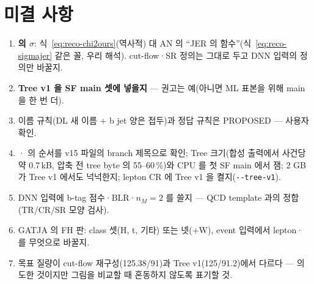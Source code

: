 \section{미결 사항}\label{sec:reco-open}
\begin{openq}
\begin{enumerate}
\item \textbf{\chisq{} 의 $\sigma$}: 식~\eqref{eq:reco-chi2ours}(역사적) 대 AN 의 ``JER 의 함수''(식~\eqref{eq:reco-sigmajer} 같은 꼴, 우리 해석).
      cut-flow·SR 정의는 그대로 두고 DNN 입력의 정의만 바꿀지.
\item \textbf{Tree v1 을 SF main 셋에 넣을지} — 권고는 예(아니면 ML 표본을 위해 main 을 한 번 더).
\item 이름 규칙(DL 새 이름 + b jet 양은  접두)과 정답 규칙은 PROPOSED — 사용자 확인.
\item {}· 의 순서를 v15 파일의 branch 제목으로 확인; Tree 크기(합성 출력에서 사건당 약 0.7\,kB, 압축 전 tree byte 의
      55–60\,\%)와 CPU 를 첫 SF main 에서 잼;  2 GB 가 Tree v1 에서도 넉넉한지; lepton CR 에 Tree v1 을 켤지(\texttt{-{}-tree-v1}).
\item DNN 입력에 b-tag 점수·BLR·$n_M=2$ \chisq{} 를 쓸지 — QCD template 과의 정합(TR/CR/SR 모양 검사).
\item GATJA 의 FH 판: class 셋(H, t, 기타) 또는 넷(+W), event 입력에서 lepton·\MET{} 를 무엇으로 바꿀지.
\item 목표 질량이 cut-flow 재구성(125.38/91)과 Tree v1(125/91.2)에서 다르다 — 의도한 것이지만 그림을 비교할 때 혼동하지 않도록 표기할 것.
\end{enumerate}
\end{openq}
